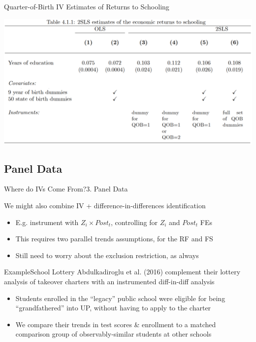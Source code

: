 \documentclass{beamer}
\begin{document}
\begin{frame}{Quarter-of-Birth IV Estimates of Returns to Schooling}

\begin{center}
\includegraphics[scale=0.32]{./lecture_includes/qob2.png}
\end{center}

\end{frame}

\subsection{Panel Data}
\begin{frame}{Where do IVs Come From?}{3. Panel Data}

We might also combine IV + difference-in-differences identification
\begin{itemize}
  \item E.g. instrument with $Z_i\times Post_t$, controlling for $Z_i$ and $Post_t$ FEs

  \item This requires two parallel trends assumptions, for the RF and FS

  \item Still need to worry about the exclusion restriction, as always
\end{itemize}\pause\medskip
\end{frame}

\begin{frame}{Example}{School Lottery}
Abdulkadiroglu et al. (2016) complement their lottery analysis of takeover charters with an instrumented diff-in-diff analysis
\begin{itemize}
  \item Students enrolled in the ``legacy'' public school were eligible for being ``grandfathered'' into UP, without having to apply to the charter

  \item We compare their trends in test scores \& enrollment to a matched comparison group of observably-similar students at other schools
\end{itemize}
\end{frame}
\end{document}
